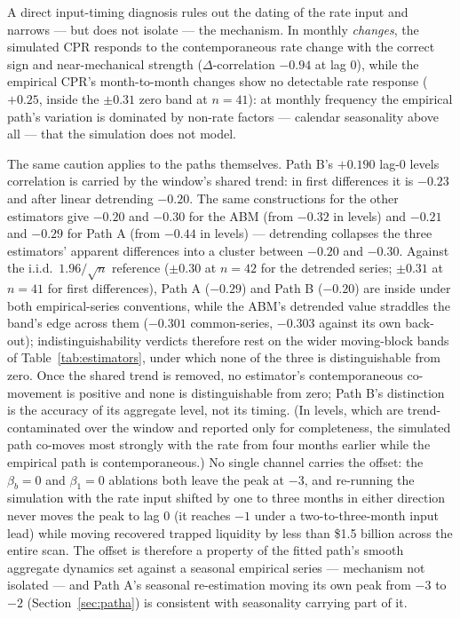 \documentclass[12pt]{article}
\begin{document}
A direct input-timing diagnosis rules out the dating of the rate input and narrows --- but does not isolate --- the mechanism. In monthly \emph{changes}, the simulated CPR responds to the contemporaneous rate change with the correct sign and near-mechanical strength ($\Delta$-correlation $-0.94$ at lag 0), while the empirical CPR's month-to-month changes show no detectable rate response ($+0.25$, inside the $\pm 0.31$ zero band at $n = 41$): at monthly frequency the empirical path's variation is dominated by non-rate factors --- calendar seasonality above all --- that the simulation does not model.

The same caution applies to the paths themselves. Path B's $+0.190$ lag-0 levels correlation is carried by the window's shared trend: in first differences it is $-0.23$ and after linear detrending $-0.20$. The same constructions for the other estimators give $-0.20$ and $-0.30$ for the ABM (from $-0.32$ in levels) and $-0.21$ and $-0.29$ for Path A (from $-0.44$ in levels) --- detrending collapses the three estimators' apparent differences into a cluster between $-0.20$ and $-0.30$. Against the i.i.d.\ $1.96/\sqrt{n}$ reference ($\pm 0.30$ at $n = 42$ for the detrended series; $\pm 0.31$ at $n = 41$ for first differences), Path A ($-0.29$) and Path B ($-0.20$) are inside under both empirical-series conventions, while the ABM's detrended value straddles the band's edge across them ($-0.301$ common-series, $-0.303$ against its own back-out); indistinguishability verdicts therefore rest on the wider moving-block bands of Table~\ref{tab:estimators}, under which none of the three is distinguishable from zero. Once the shared trend is removed, no estimator's contemporaneous co-movement is positive and none is distinguishable from zero; Path B's distinction is the accuracy of its aggregate level, not its timing. (In levels, which are trend-contaminated over the window and reported only for completeness, the simulated path co-moves most strongly with the rate from four months earlier while the empirical path is contemporaneous.) No single channel carries the offset: the $\beta_b = 0$ and $\beta_1 = 0$ ablations both leave the peak at $-3$, and re-running the simulation with the rate input shifted by one to three months in either direction never moves the peak to lag 0 (it reaches $-1$ under a two-to-three-month input lead) while moving recovered trapped liquidity by less than \$1.5 billion across the entire scan. The offset is therefore a property of the fitted path's smooth aggregate dynamics set against a seasonal empirical series --- mechanism not isolated --- and Path A's seasonal re-estimation moving its own peak from $-3$ to $-2$ (Section~\ref{sec:patha}) is consistent with seasonality carrying part of it.
\end{document}
